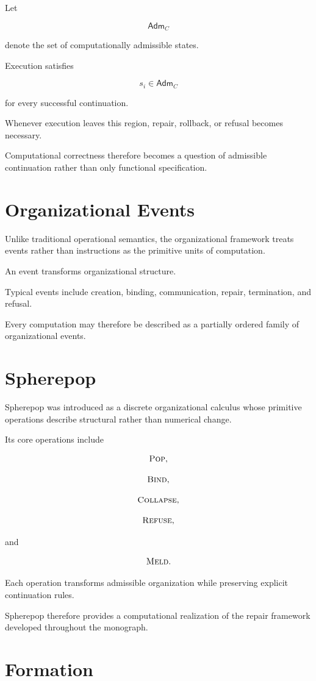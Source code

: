 \documentclass[11pt,oneside]{book}
\numberwithin{equation}{chapter}
\theoremstyle{definition}
\theoremstyle{plain}
\newcommand{\Adm}{\mathsf{Adm}}
\begin{document}
Let

\[
\Adm_C
\]

denote the set of computationally admissible states.

Execution satisfies

\[
s_i
\in
\Adm_C
\]

for every successful continuation.

Whenever execution leaves this region, repair, rollback, or refusal
becomes necessary.

Computational correctness therefore becomes a question of admissible
continuation rather than only functional specification.

\section{Organizational Events}

Unlike traditional operational semantics, the organizational framework
treats events rather than instructions as the primitive units of
computation.

An event transforms organizational structure.

Typical events include creation, binding, communication, repair,
termination, and refusal.

Every computation may therefore be described as a partially ordered
family of organizational events.

\section{Spherepop}

Spherepop was introduced as a discrete organizational calculus whose
primitive operations describe structural rather than numerical change.

Its core operations include

\[
\textsc{Pop},
\]

\[
\textsc{Bind},
\]

\[
\textsc{Collapse},
\]

\[
\textsc{Refuse},
\]

and

\[
\textsc{Meld}.
\]

Each operation transforms admissible organization while preserving
explicit continuation rules.

Spherepop therefore provides a computational realization of the repair
framework developed throughout the monograph.

\section{Formation}
\end{document}
